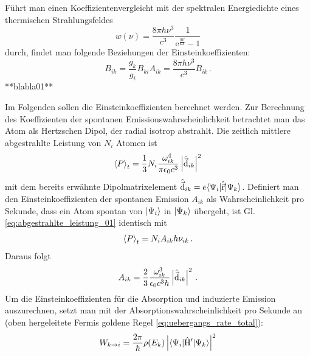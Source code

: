 Führt man einen Koeffizientenvergleicht mit der spektralen
Energiedichte eines thermischen Strahlungsfeldes \cite{demtroeder:ex3}
\begin{equation}\label{eq:spektrale_energiedichte_2}
	w(\nu)=\frac{8\pi h\nu^3}{c^3}\frac{1}{\mathrm{e}^\frac{h\nu}{kT}-1}
\end{equation}
durch, findet man folgende Beziehungen der Einsteinkoeffizienten:
\begin{subequations}\label{eq:einsteinkoeff_relationen}
	\begin{equation}\label{eq:einsteinkoeff_relationen_1}
		B_{ik}=\frac{g_k}{g_i}B_{ki}
	\end{equation}
	\begin{equation}\label{eq:einsteinkoeff_relationen_2}
		A_{ik}=\frac{8\pi h\nu^3}{c^3}B_{ik}\,.
	\end{equation}
\end{subequations}
**blabla01**
\par
Im Folgenden sollen die Einsteinkoeffizienten berechnet werden.
Zur Berechnung des Koeffizienten der spontanen Emissionswahrscheinlichkeit
betrachtet man das Atom als Hertzschen Dipol, der radial isotrop abstrahlt. Die
zeitlich mittlere abgestrahlte Leistung von $N_i$ Atomen
\cite{demtroeder:ex3} ist
\begin{equation}\label{eq:abgestrahlte_leistung_01}
	\left\langle P\right\rangle_t = \frac{1}{3}N_i\frac{\omega_{ik}^4}{\pi\epsilon_0
	c^3}\left|\hat{\vec{\mathrm{d}}}_{ik}\right|^2
\end{equation}
mit dem bereits erwähnte Dipolmatrixelement
$\hat{\vec{\mathrm{d}}}_{ik}=e\langle{\Psi_i}|\hat{\vec{\mathrm{r}}}|{\Psi_k}\rangle$. Definiert man den
Einsteinkoeffizienten der spontanen Emission $A_{ik}$ als Wahrscheinlichkeit pro
Sekunde, dass ein Atom spontan von $|{\Psi_i}\rangle$ in $|{\Psi_k}\rangle$ übergeht,
ist Gl. \eqref{eq:abgestrahlte_leistung_01} identisch mit
\begin{equation}\label{eq:abgestrahlte_leistung_02}
	\left\langle P\right\rangle_t=N_iA_{ik}h\nu_{ik}\,.
\end{equation}
Daraus folgt
\begin{equation}\label{eq:einstein_koeff_A}
	A_{ik}=\frac{2}{3}\frac{\omega_{ik}^3}{\epsilon_0c^3h}\left|\hat{\vec{\mathrm{d}}}_{ik}\right|^2\,.
\end{equation}
Um die Einsteinkoeffizienten für die Absorption und induzierte Emission
auszurechnen, setzt man mit der Absorptionswahrscheinlichkeit pro Sekunde an
(oben hergeleitete Fermis goldene Regel \eqref{eq:uebergangs_rate_total}):
\begin{equation}\label{eq:w_ki_01}
	W_{k\to i}
	= \frac{2\pi}{\hbar}\rho(E_k)\left|\langle{\Psi_i}|\hat{\mathrm{H}}'|{\Psi_k}\rangle\right|^2
\end{equation}
